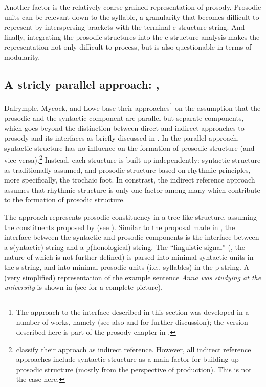 \documentclass[output=paper,hidelinks]{langscibook}
\begin{document}
\begin{sloppypar}
Another factor is the relatively coarse-grained representation of prosody. Prosodic units can be relevant down to the syllable, a granularity that becomes difficult to represent by interspersing brackets with the terminal c-structure string.
And finally, integrating the prosodic structures into the c-structure analysis makes the representation not only difficult to process, but is also questionable in terms of modularity.
\end{sloppypar}

\subsection{A stricly parallel approach: \citet{DM11}, \citet{MycockLowe2013}}
\label{subsec:Dalrympleetal}

Dalrymple, Mycock, and Lowe base their approaches\footnote{The approach to the interface described in this section was developed in a number of works, namely \citet{Mycock2006, DM11, MycockLowe2013} (see also \citealt{lowe:16a} and \citealt{Jones2016} for further discussion); the version described here is part of the prosody chapter in \citealt{DLM:LFG}.} on the assumption that the prosodic and the syntactic component are parallel but separate components, which goes beyond the distinction between direct and indirect approaches to prosody and its interfaces as briefly discussed in . In the parallel approach, syntactic structure has no influence on the formation of prosodic structure (and vice versa).\footnote{\citet[398]{DLM:LFG} classify their approach as indirect reference. However, all indirect reference approaches include syntactic structure as a main factor for building up prosodic structure (mostly from the perspective of production). This is not the case here.} Instead, each structure is built up independently: syntactic structure as traditionally assumed, and prosodic structure based on rhythmic principles, more specifically, the trochaic foot. In constrast, the indirect reference approach assumes that rhythmic structure is only one factor among many which contribute to the formation of prosodic structure.

The approach represents prosodic constituency in a tree-like structure, assuming the constituents proposed by \citet{Selkirk1995} (see ). Similar to the proposal made in  \citet{boegel-etal2010}, the interface between the syntactic and prosodic components is the interface between a s(yntactic)-string and a p(honolog\-i\-cal)-string. The ``linguistic signal'' (\citet[][407]{DLM:LFG}, the nature of which is not further defined) is parsed into minimal syntactic units in the s-string, and into minimal prosodic units (i.e., syllables) in the p-string.
A (very simplified) representation of the example sentence {\em Anna was studying at the university} is shown in  (see  for a complete picture).
\end{document}
